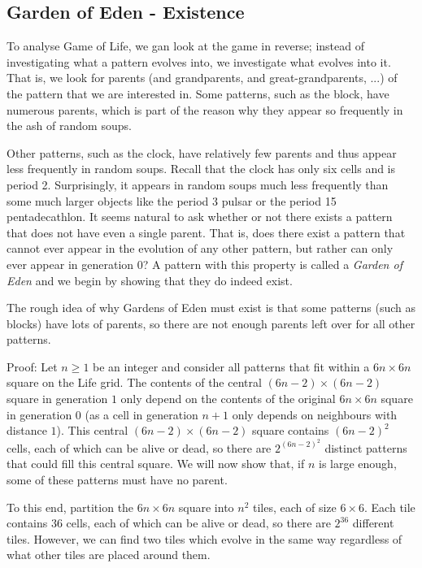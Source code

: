 
\subsection{Garden of Eden - Existence}

To analyse Game of Life, we gan look at the game in reverse; instead of investigating what a pattern evolves into, we investigate what evolves into it. That is, we look for parents (and grandparents, and great-grandparents, ...) of the pattern that we are interested in. Some patterns, such as the block, have numerous parents, which is part of the reason why they appear so frequently in the ash of random soups.

Other patterns, such as the clock, have relatively few parents and thus appear less frequently in random soups. Recall that the clock has only six cells and is period 2. Surprisingly, it appears in random soups much less frequently than some much larger objects like the period 3 pulsar or the period 15 pentadecathlon. It seems natural to ask whether or not there exists a pattern that does not have even a single parent. That is, does there exist a pattern that cannot ever appear in the evolution of any other pattern, but rather can only ever appear in generation 0? A pattern with this property is called a \emph{Garden of Eden} and we begin by showing that they do indeed exist.

The rough idea of why Gardens of Eden must exist is that some patterns (such as blocks) have lots of parents, so there are not enough parents left over for all other patterns.

Proof: Let $n \geq 1$ be an integer and consider all patterns that fit within a $6n \times 6n$ square on the Life grid. The contents of the central $(6n - 2) \times (6n - 2)$ square in generation $1$ only depend on the contents of the original $6n \times 6n$ square in generation $0$ (as a cell in generation $n+1$ only depends on neighbours with distance $1$). This central $(6n - 2) \times (6n - 2)$ square contains $(6n - 2)^2$ cells, each of which can be alive or dead, so there are $2^{(6n - 2)^2}$ distinct patterns that could fill this central square. We will now show that, if $n$ is large enough, some of these patterns must have no parent.

To this end, partition the $6n \times 6n$ square into $n^2$ tiles, each of size $6 \times 6$. Each tile contains $36$ cells, each of which can be alive or dead, so there are $2^{36}$ different tiles. However, we can find two tiles which evolve in the same way regardless of what other tiles are placed around them.

